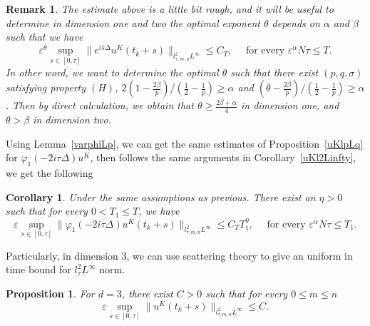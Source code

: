 \documentclass[10pt,a4paper]{article}
\newtheorem{corollary}[theorem]{Corollary}
\newtheorem{proposition}[theorem]{Proposition}
\newtheorem{remark}[theorem]{Remark}
\begin{document}
  \begin{remark}\label{remuKl2Linfty}
    The estimate above is a little bit rough, and it will be useful to determine 
    in dimension one and two the optimal exponent \(\theta\) depends on \(\alpha\) 
    and \(\beta\)  such that we have
    \[ \varepsilon^\theta \sup_{s\in[0,\tau]} \|e^{i\hat{s}\Delta}u^K(t_k+s)\|_{l^2_{\tau,m,n}L^\infty} 
    \leq C_T, \quad \text{ for every } \varepsilon^\alpha N \tau \leq T. \]
    In other word, we want to determine the optimal \(\theta\) such that there
    exist \((p,q,\sigma)\) satisfying property \((H)\), 
    \(2(1-\frac{2\beta}p)/(\frac12-\frac1p) \geq \alpha\) and 
    \((\theta-\frac{2\beta}p)/(\frac12-\frac1p) \geq \alpha\). Then by direct
    calculation, we obtain that \(\theta\geq \frac{2\beta+\alpha}4\) in dimension
    one, and \(\theta > \beta \) in dimension two.
  \end{remark}

  Using Lemma~\ref{varphiLp}, we can get the same estimates of Proposition~\ref{uKlpLq} 
  for \(\varphi_1(-2i\tau\Delta)u^K\), then follows the same arguments in
  Corollary~\ref{uKl2Linfty}, we get the following

  \begin{corollary}\label{phiuKlpLq}
    Under the same assumptions as previous. There exist
    an \(\eta>0\) such that for every \(0< T_1 \leq T\), we have 
    \[ \varepsilon \sup_{s\in[0,\tau]} \|\varphi_1(-2i\tau\Delta)u^K(t_k+s)\|_{l^2_{\tau,m,n}L^\infty} 
    \leq C_T T_1^\eta, \quad \text{ for every } \varepsilon^\alpha N \tau \leq T_1. \]
  \end{corollary}

  Particularly, in dimension 3, we can use scattering theory to give an uniform
  in time bound for \(l^2_\tau L^\infty\) norm. 

  \begin{proposition}\label{uKl2Linftyd3}
    For \(d=3\), there exist \(C>0\) such that for every \(0\leq m\leq n\)
    \[ \varepsilon \sup_{s\in[0,\tau]} \|u^K(t_k+s)\|_{l^2_{\tau,m,n}L^\infty} 
    \leq C. \]
  \end{proposition}
\end{document}
